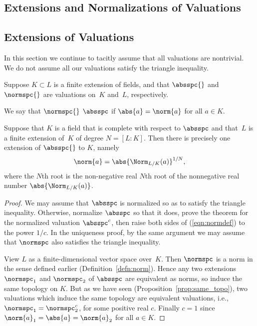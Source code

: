 \documentclass[11pt]{book}
\begin{document}
\begin{ch}
\chapter{Extensions and Normalizations of Valuations}
\section{Extensions of Valuations}
In this section we continue to tacitly assume that all valuations are
nontrivial.  We do not assume all our valuations satisfy the triangle inequality.


Suppose $K\subset L$ is a finite extension of fields, and that $\absspc{}$ and $\normspc{}$
are valuations on~$K$ and~$L$, respectively.
\begin{definition}[Extends]
We say that $\normspc{}$ 
$\absspc$ if $\abs{a} = \norm{a}$ for all $a\in K$.
\end{definition}
\begin{theorem}\label{thm:extunique}
Suppose that $K$ is a field that is complete with respect to $\absspc$
and that~$L$ is a finite extension of~$K$ of degree $N=[L:K]$.
Then there is precisely
one extension of $\absspc{}$ to $K$, namely
\begin{equation}
  \norm{a} = \abs{\Norm_{L/K}(a)}^{1/N},
\label{eqn:normdef}\end{equation}
where the $N$th root is the non-negative real $N$th root of the
nonnegative real number $\abs{\Norm_{L/K}(a)}$.
\end{theorem}
\begin{proof}
We may assume that $\absspc$ is normalized so as
to satisfy the triangle inequality.  Otherwise, normalize
$\absspc$ so that it does, prove the theorem for the normalized
valuation $\absspc^c$, then raise both sides of (\ref{eqn:normdef})
to the power $1/c$.  In the uniqueness proof, by the same
argument we may assume that $\normspc$ also satisfies the triangle
inequality.

\vspace{1ex}  View $L$ as a
finite-dimensional vector space over~$K$. Then $\normspc$ is a norm in
the sense defined earlier (Definition~\ref{defn:norm}).  Hence any two
extensions $\normspc_1$ and $\normspc_2$ of $\absspc$ are equivalent
as norms, so induce the same topology on $K$.  But as we have
seen (Proposition~\ref{prop:same_topo}), two valuations which induce the same topology are
equivalent valuations, i.e., $\normspc_1 = \normspc_2^c$, for some
positive real $c$.  Finally $c=1$ since $\norm{a}_1 = \abs{a} =
\norm{a}_2$ for all $a\in K$.


\end{proof}
\end{ch}
\end{document}
